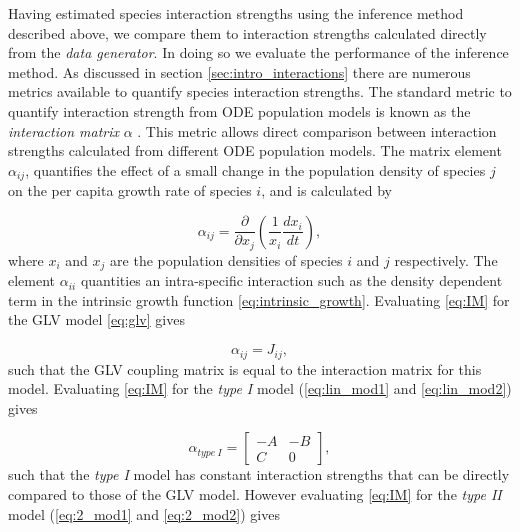 Having estimated species interaction strengths using the inference method described above, we compare them to interaction strengths calculated directly from the \emph{data generator}. In doing so we evaluate the performance of the inference method. As discussed in section \ref{sec:intro_interactions} there are numerous metrics available to quantify species interaction strengths. The standard metric to quantify interaction strength from ODE population models is known as the \emph{interaction matrix} $\alpha $ \cite{wootton2005measurement}. This metric allows direct comparison between interaction strengths calculated from different ODE population models. The matrix element $\alpha_{ij}$, quantifies the effect of a small change in the population density of species $j$ on the per capita growth rate of species $i$, and is calculated by

\begin{equation}
\alpha_{ij} = \frac{\partial}{\partial x_{j}}\left(\frac{1}{x_{i}} \frac{dx_i}{dt} \right),
\label{eq:IM}
\end{equation}
%
where $x_i$ and $x_j$ are the population densities of species $i$ and $j$ respectively.  The element $\alpha_{ii}$ quantities an intra-specific interaction such as the density dependent term in the intrinsic growth function \eqref{eq:intrinsic_growth}. Evaluating \eqref{eq:IM} for the GLV model \eqref{eq:glv} gives

\begin{equation}
\alpha_{ij} = J_{ij},
\label{eq:alpha_glv}
\end{equation}
% 
such that the GLV coupling matrix is equal to the interaction matrix for this model. Evaluating \eqref{eq:IM} for the \emph{type I} model (\eqref{eq:lin_mod1} and \eqref{eq:lin_mod2}) gives

\begin{equation}
\alpha_{type\ I} = 
\begin{bmatrix}
-A & -B \\ C & 0
\end{bmatrix}  	,
\end{equation}
%
such that the \emph{type I} model has constant interaction strengths that can be directly compared to those of the GLV model. However evaluating \eqref{eq:IM} for the \emph{type II} model (\eqref{eq:2_mod1} and \eqref{eq:2_mod2}) gives

